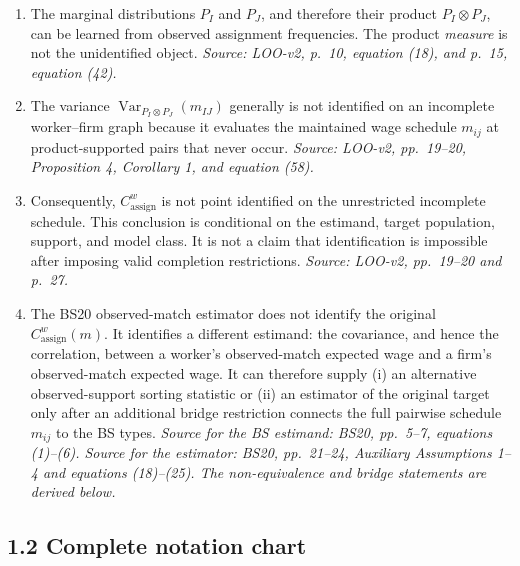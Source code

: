 \documentclass[11pt]{article}
\begin{document}
\begin{enumerate}
\item The marginal distributions \(P_I\) and \(P_J\), and therefore their
  product \(P_I\otimes P_J\), can be learned from observed assignment
  frequencies.  The product \emph{measure} is not the unidentified object.
  \textit{Source: LOO-v2, p.\ 10, equation (18), and p.\ 15, equation (42).}
\item The variance
  \(\operatorname{Var}_{P_I\otimes P_J}(m_{IJ})\) generally is not identified
  on an incomplete worker--firm graph because it evaluates the maintained wage
  schedule \(m_{ij}\) at product-supported pairs that never occur.
  \textit{Source: LOO-v2, pp.\ 19--20, Proposition 4, Corollary 1, and
  equation (58).}
\item Consequently, \(C^w_{\mathrm{assign}}\) is not point identified on the
  unrestricted incomplete schedule.  This conclusion is conditional on the
  estimand, target population, support, and model class.  It is not a claim
  that identification is impossible after imposing valid completion
  restrictions.  \textit{Source: LOO-v2, pp.\ 19--20 and p.\ 27.}
\item The BS20 observed-match estimator does not identify the original
  \(C^w_{\mathrm{assign}}(m)\).  It identifies a different estimand: the
  covariance, and hence the correlation, between a worker's observed-match
  expected wage and a firm's observed-match expected wage.  It can therefore
  supply (i) an alternative observed-support sorting statistic or (ii) an
  estimator of the original target only after an additional bridge restriction
  connects the full pairwise schedule \(m_{ij}\) to the BS types.
  \textit{Source for the BS estimand: BS20, pp.\ 5--7, equations (1)--(6).
  Source for the estimator: BS20, pp.\ 21--24, Auxiliary Assumptions 1--4 and
  equations (18)--(25).  The non-equivalence and bridge statements are derived
  below.}
\end{enumerate}

\subsection{1.2 Complete notation chart}
\end{document}

